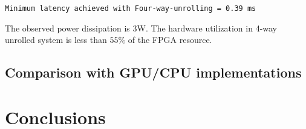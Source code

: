 \documentclass[runningheads]{llncs}
\begin{document}
\begin{verbatim}
Minimum latency achieved with Four-way-unrolling = 0.39 ms
\end{verbatim}
The observed power dissipation is 3W.  The hardware utilization
in 4-way unrolled system is less than $55\%$ of the FPGA resource.

\subsection{Comparison with GPU/CPU implementations}

\section{Conclusions}\label{s:conclusions}



\end{document}
